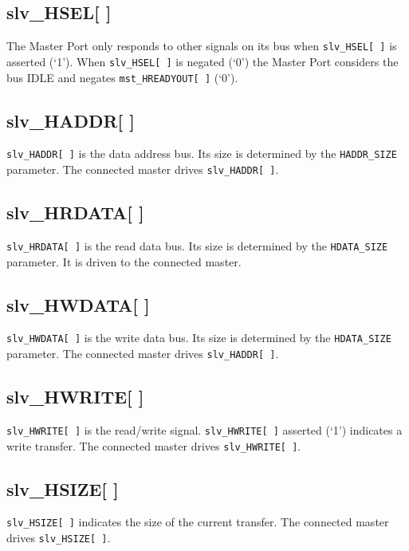 \subsection{slv\_HSEL[ ]}\label{slv_hsel}

The Master Port only responds to other signals on its bus when \texttt{slv\_HSEL[\,]} is
asserted (`1'). When \texttt{slv\_HSEL[\,]} is negated (`0') the Master Port
considers the bus IDLE and negates \texttt{mst\_HREADYOUT[\,]} (`0').

\subsection{slv\_HADDR[ ]}\label{slv_haddr}

\texttt{slv\_HADDR[\,]} is the data address bus. Its size is determined by the
\texttt{HADDR\_SIZE} parameter. The connected master drives \texttt{slv\_HADDR[\,]}.

\subsection{slv\_HRDATA[ ]}\label{slv_hrdata}

\texttt{slv\_HRDATA[ ]} is the read data bus. Its size is determined by the
\texttt{HDATA\_SIZE} parameter. It is driven to the connected master.

\subsection{slv\_HWDATA[ ]}\label{slv_hwdata}

\texttt{slv\_HWDATA[\,]} is the write data bus. Its size is determined by the
\texttt{HDATA\_SIZE} parameter. The connected master drives \texttt{slv\_HADDR[\,]}.

\subsection{slv\_HWRITE[ ]}\label{slv_hwrite}

\texttt{slv\_HWRITE[\,]} is the read/write signal. \texttt{slv\_HWRITE[\,]} asserted (`1') indicates a
write transfer. The connected master drives \texttt{slv\_HWRITE[\,]}.

\subsection{slv\_HSIZE[ ]}\label{slv_hsize}

\texttt{slv\_HSIZE[\,]} indicates the size of the current transfer. The connected
master drives \texttt{slv\_HSIZE[\,]}.


